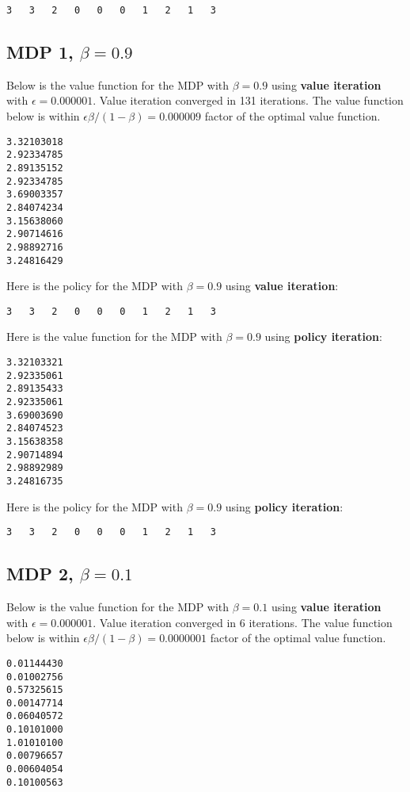 \documentclass[paper=a4, fontsize=11pt]{scrartcl}
\begin{document}
\begin{verbatim}
3	3	2	0	0	0	1	2	1	3
\end{verbatim}

\subsection{MDP 1, $\beta = 0.9$}

Below is the value function for the MDP with $\beta = 0.9$ using \textbf{value iteration} with $\epsilon = 0.000001$. Value iteration converged in 131 iterations. The value function below is within $\epsilon \beta / (1 - \beta) = 0.000009$ factor of the optimal value function.

\begin{verbatim}
3.32103018
2.92334785
2.89135152
2.92334785
3.69003357
2.84074234
3.15638060
2.90714616
2.98892716
3.24816429
\end{verbatim}

Here is the policy for the MDP with $\beta = 0.9$ using \textbf{value iteration}:

\begin{verbatim}
3	3	2	0	0	0	1	2	1	3
\end{verbatim}

Here is the value function for the MDP with $\beta = 0.9$ using \textbf{policy iteration}:

\begin{verbatim}
3.32103321
2.92335061
2.89135433
2.92335061
3.69003690
2.84074523
3.15638358
2.90714894
2.98892989
3.24816735
\end{verbatim}

Here is the policy for the MDP with $\beta = 0.9$ using \textbf{policy iteration}:

\begin{verbatim}
3	3	2	0	0	0	1	2	1	3
\end{verbatim}

\subsection{MDP 2, $\beta = 0.1$}

Below is the value function for the MDP with $\beta = 0.1$ using \textbf{value iteration} with $\epsilon = 0.000001$. Value iteration converged in 6 iterations. The value function below is within $\epsilon \beta / (1 - \beta) = 0.0000001$ factor of the optimal value function.

\begin{verbatim}
0.01144430
0.01002756
0.57325615
0.00147714
0.06040572
0.10101000
1.01010100
0.00796657
0.00604054
0.10100563
\end{verbatim}
\end{document}
